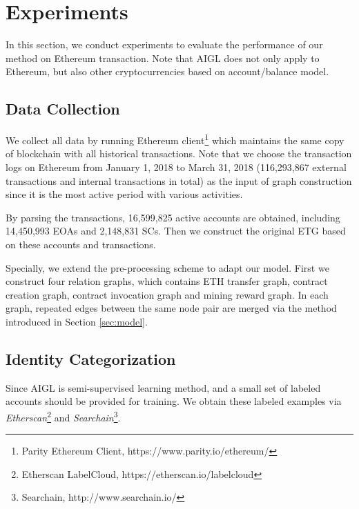 
\section{Experiments}
\label{sec:experiments}
In this section, we conduct experiments to evaluate the performance of our method on Ethereum transaction. Note that AIGL does not only apply to Ethereum, but also other cryptocurrencies based on account/balance model.

\subsection{Data Collection}
We collect all data by running Ethereum client\footnote{Parity Ethereum Client, https://www.parity.io/ethereum/} which maintains the same copy of blockchain with all historical transactions. Note that we choose the transaction logs on Ethereum from January 1, 2018 to March 31, 2018 (116,293,867 external transactions and internal transactions in total) as the input of graph construction since it is the most active period with various activities.

By parsing the transactions, 16,599,825 active accounts are obtained, including 14,450,993 EOAs and 2,148,831 SCs. Then we construct the original ETG based on these accounts and transactions.

Specially, we extend the pre-processing scheme to adapt our model. First we construct four relation graphs, which contains ETH transfer graph, contract creation graph, contract invocation graph and mining reward graph. In each graph, repeated edges between the same node pair are merged via the method introduced in Section \ref{sec:model}.


\subsection{Identity Categorization}
Since AIGL is semi-supervised learning method, and a small set of labeled accounts should be provided for training. We obtain these labeled examples via \emph{Etherscan}\footnote{Etherscan LabelCloud, https://etherscan.io/labelcloud} and \emph{Searchain}\footnote{Searchain, http://www.searchain.io/}. 

